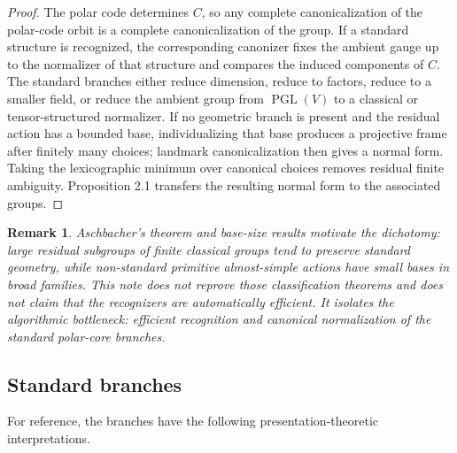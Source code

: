 \documentclass[11pt]{article}
\newtheorem{remark}[theorem]{Remark}
\begin{document}
\begin{proof}
The polar code determines $C$, so any complete canonicalization of the polar-code orbit is a complete canonicalization of the group. If a standard structure is recognized, the corresponding canonizer fixes the ambient gauge up to the normalizer of that structure and compares the induced components of $C$. The standard branches either reduce dimension, reduce to factors, reduce to a smaller field, or reduce the ambient group from $\operatorname{PGL}(V)$ to a classical or tensor-structured normalizer. If no geometric branch is present and the residual action has a bounded base, individualizing that base produces a projective frame after finitely many choices; landmark canonicalization then gives a normal form. Taking the lexicographic minimum over canonical choices removes residual finite ambiguity. Proposition 2.1 transfers the resulting normal form to the associated groups.
\end{proof}

\begin{remark}
Aschbacher's theorem and base-size results motivate the dichotomy: large residual subgroups of finite classical groups tend to preserve standard geometry, while non-standard primitive almost-simple actions have small bases in broad families. This note does not reprove those classification theorems and does not claim that the recognizers are automatically efficient. It isolates the algorithmic bottleneck: efficient recognition and canonical normalization of the standard polar-core branches.
\end{remark}

\subsection{Standard branches}

For reference, the branches have the following presentation-theoretic interpretations.
\end{document}
